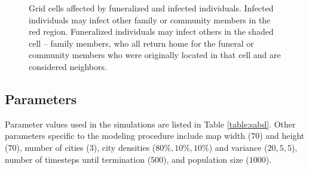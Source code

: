 \begin{figure}[h!]
\begin{center}
\end{center}
\caption{Grid cells affected by funeralized and infected individuals. Infected individuals may infect other family or community members in the red region. Funeralized individuals may infect others in the shaded cell -- family members, who all return home for the funeral or community members who were originally located in that cell and are considered neighbors.}
\label{fig:infect}
\end{figure}

\subsection{Parameters}
Parameter values used in the simulations are listed in Table \ref{table:sabd}. Other parameters specific to the modeling procedure include map width ($70$) and height ($70$), number of cities ($3$), city densities ($80\%, 10\%, 10\%$) and variance ($20,5,5$), number of timesteps until termination ($500$), and population size ($1000$).

